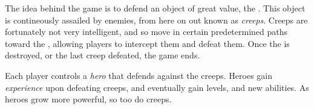 The idea behind the game is to defend an object of great value, the \objective.
This object is contineously assailed by enemies, from here on out known as \emph{creeps}.
Creeps are fortunately not very intelligent, and so move in certain predetermined
paths toward the \objective, allowing players to intercept them and defeat them.
Once the \objective is destroyed, or the last creep defeated, the game ends.

Each player controls a \emph{hero} that defends against the creeps. Heroes gain
\emph{experience} upon defeating creeps, and eventually gain levels, and new abilities.
As heroes grow more powerful, so too do creeps.
